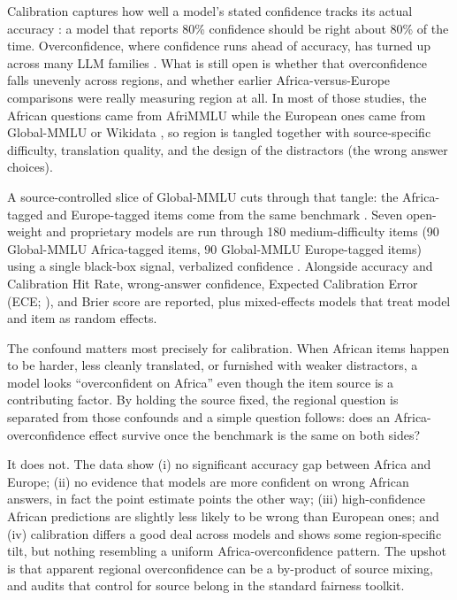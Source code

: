 \documentclass[11pt]{article}
\begin{document}
Calibration captures how well a model's stated confidence tracks its actual accuracy \cite{guo2017calibration}: a model that reports 80\% confidence should be right about 80\% of the time. Overconfidence, where confidence runs ahead of accuracy, has turned up across many LLM families \cite{chhikara2025mind,xia2026calibration}. What is still open is whether that overconfidence falls unevenly across regions, and whether earlier Africa-versus-Europe comparisons were really measuring region at all. In most of those studies, the African questions came from AfriMMLU while the European ones came from Global-MMLU or Wikidata \cite{singh2025global,adelani2025irokobench}, so region is tangled together with source-specific difficulty, translation quality, and the design of the distractors (the wrong answer choices).

A source-controlled slice of Global-MMLU cuts through that tangle: the Africa-tagged and Europe-tagged items come from the same benchmark \cite{singh2025global}. Seven open-weight and proprietary models are run through 180 medium-difficulty items (90 Global-MMLU Africa-tagged items, 90 Global-MMLU Europe-tagged items) using a single black-box signal, verbalized confidence \cite{kadavath2022language,tian2023just}. Alongside accuracy and Calibration Hit Rate, wrong-answer confidence, Expected Calibration Error (ECE; \citealp{guo2017calibration}), and Brier score \cite{niculescu2005predicting} are reported, plus mixed-effects models that treat model and item as random effects.

The confound matters most precisely for calibration. When African items happen to be harder, less cleanly translated, or furnished with weaker distractors, a model looks ``overconfident on Africa'' even though the item source is a contributing factor. By holding the source fixed, the regional question is separated from those confounds and a simple question follows: does an Africa-overconfidence effect survive once the benchmark is the same on both sides?

It does not. The data show (i) no significant accuracy gap between Africa and Europe; (ii) no evidence that models are more confident on wrong African answers, in fact the point estimate points the other way; (iii) high-confidence African predictions are slightly less likely to be wrong than European ones; and (iv) calibration differs a good deal across models and shows some region-specific tilt, but nothing resembling a uniform Africa-overconfidence pattern. The upshot is that apparent regional overconfidence can be a by-product of source mixing, and audits that control for source belong in the standard fairness toolkit.
\end{document}
